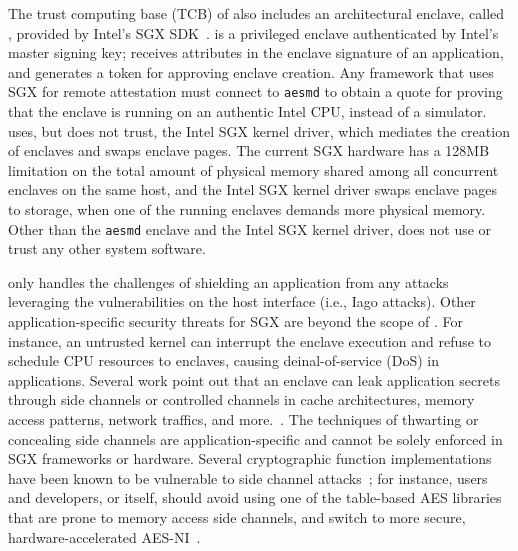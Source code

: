The trust computing base (TCB) of \graphenesgx{} also includes
an architectural enclave,
called , provided by Intel's SGX SDK~\cite{intel-sgx-linux-sdk}.
 is a privileged enclave
authenticated by Intel's master signing key;
 receives attributes in the enclave signature of an application,
and generates a token for approving enclave creation.
Any framework that uses SGX for remote attestation must connect to {\tt aesmd}
to obtain a quote for proving that the enclave is running on an authentic Intel CPU, instead of a simulator. 
\graphenesgx{} uses, but does not trust, the Intel SGX kernel driver, which mediates the creation of enclaves and swaps enclave pages.
The current SGX hardware
has a 128MB limitation on the total amount of physical memory shared among all concurrent enclaves on the same host,
and the Intel SGX kernel driver swaps enclave pages to storage,
when one of the running enclaves demands more
physical memory.
Other than the {\tt aesmd} enclave and the Intel SGX kernel driver, \graphenesgx{} does not use or trust any other system software.



\graphenesgx{} only handles the challenges of shielding an application from any attacks leveraging the vulnerabilities on the host interface (i.e., Iago attacks).
Other application-specific security threats
for SGX are beyond the scope of \graphenesgx{}.
For instance, an untrusted kernel
can interrupt the enclave execution and refuse to schedule CPU resources to enclaves,
causing deinal-of-service (DoS) in applications.
Several work point out that
an enclave can leak application secrets through
side channels or controlled channels
in cache architectures, memory access patterns, network traffics, and more.~\cite{xu15controlledchannel,atc17side-channel,chen17side-channel,gotzfried17cache-attack,moghimi17cachezoom,xiao17stacco,wang17side-channel}.
The techniques of thwarting or concealing side channels are application-specific and cannot be solely enforced in SGX frameworks or hardware.
Several cryptographic function implementations
have been known to be vulnerable to side channel attacks~\cite{zhou2005side-channels,yarom2017cachebleed};
for instance, users and developers, or \graphenesgx{} itself, should avoid using one of the table-based AES libraries that are prone to memory access side channels,
and switch to more secure,
hardware-accelerated AES-NI~\cite{hofemeier2012aesni}.


